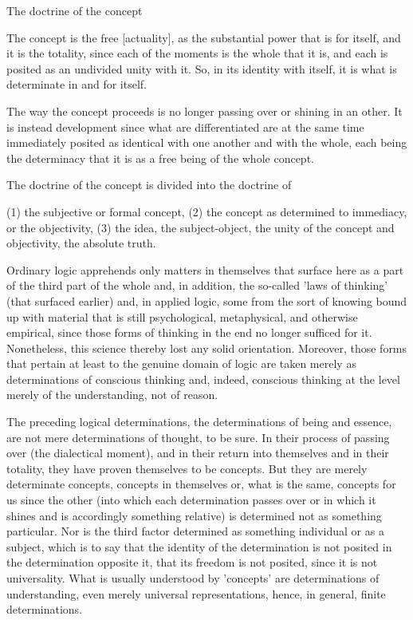 The doctrine of the concept

The concept is the free [actuality],
as the substantial power that is for itself,
and it is the totality,
since each of the moments is the whole that it is,
and each is posited as an undivided unity with it.
So, in its identity with itself,
it is what is determinate in and for itself.

The way the concept proceeds is
no longer passing over or shining in an other.
It is instead development
since what are differentiated are
at the same time immediately posited as
identical with one another and with the whole,
each being the determinacy that it is
as a free being of the whole concept.

The doctrine of the concept is divided into the doctrine of

(1) the subjective or formal concept,
(2) the concept as determined to immediacy,
    or the objectivity,
(3) the idea,
    the subject-object,
    the unity of the concept and objectivity,
    the absolute truth.

Ordinary logic apprehends only matters in themselves
that surface here as a part of the third part of the whole
and, in addition, the so-called 'laws of thinking' (that surfaced earlier)
and, in applied logic, some from the sort of knowing
bound up with material that is still
psychological, metaphysical, and otherwise empirical,
since those forms of thinking in the end
no longer sufficed for it.
Nonetheless, this science thereby lost any solid orientation.
Moreover, those forms that pertain at least
to the genuine domain of logic
are taken merely as determinations of conscious thinking
and, indeed, conscious thinking at the level merely
of the understanding, not of reason.

The preceding logical determinations,
the determinations of being and essence,
are not mere determinations of thought, to be sure.
In their process of passing over (the dialectical moment),
and in their return into themselves and in their totality,
they have proven themselves to be concepts.
But they are merely determinate concepts,
concepts in themselves or, what is the same,
concepts for us since the other
(into which each determination passes over
or in which it shines and is accordingly something relative)
is determined not as something particular.
Nor is the third factor determined as
something individual or as a subject,
which is to say that the identity of the determination is
not posited in the determination opposite it,
that its freedom is not posited,
since it is not universality.
What is usually understood by 'concepts' are
determinations of understanding,
even merely universal representations,
hence, in general, finite determinations.

